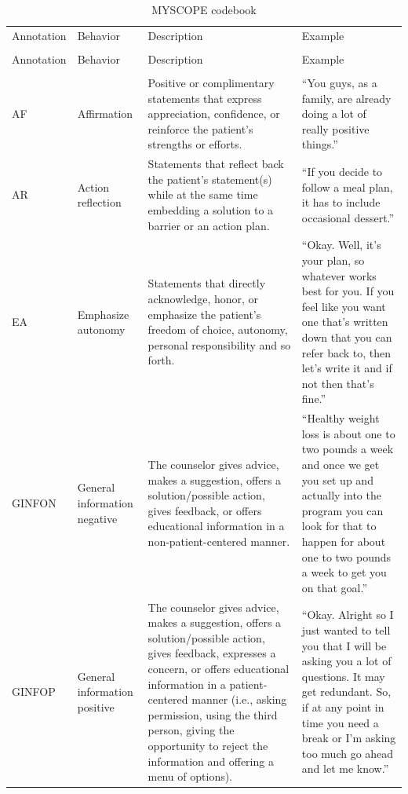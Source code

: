 \documentclass[smallextended]{svjour3}       %
\begin{document}
\begin{small}
\begin{longtable}{p{1.3cm}p{2cm}p{5cm}p{4.8cm}}
\caption{MYSCOPE codebook} 
\label{tab:codebook} \\
\hline\noalign{\smallskip}
Annotation & Behavior & Description & Example \\ 
\noalign{\smallskip}\hline\noalign{\smallskip}
\endfirsthead
\multicolumn{4}{@{}l}{\textbf{Table\ref{tab:codebook}} (continued)} \\ 
\noalign{\smallskip}\hline\noalign{\smallskip}
Annotation & Behavior & Description & Example \\
\noalign{\smallskip}\hline\noalign{\smallskip}
\endhead

\rowcolor{lightgraycol}
\noalign{\smallskip}
\multicolumn{4}{l}{\textbf{Counselor}} \\
\noalign{\smallskip}
AF & Affirmation & Positive or complimentary statements that express appreciation, confidence, or reinforce the patient's strengths or efforts. & ``You guys, as a family, are already doing a lot of really positive things.'' \\
AR & Action reflection & Statements that reflect back the patient's statement(s) while at the same time embedding a solution to a barrier or an action plan. & ``If you decide to follow a meal plan, it has to include occasional dessert.'' \\
EA & Emphasize autonomy & Statements that directly acknowledge, honor, or emphasize the patient's freedom of choice, autonomy, personal responsibility and so forth. & ``Okay. Well, it's your plan, so whatever works best for you. If you feel like you want one that's written down that you can refer back to, then let's write it and if not then that's fine.''\\
GINFON & General information negative & The counselor gives advice, makes a suggestion, offers a solution/possible action, gives feedback, or offers educational information in a non-patient-centered manner. & ``Healthy weight loss is about one to two pounds a week and once we get you set up and actually into the program you can look for that to happen for about one to two pounds a week to get you on that goal.''\\
GINFOP & General information positive & The counselor gives advice, makes a suggestion, offers a solution/possible action, gives feedback, expresses a concern, or offers educational information in a patient-centered manner (i.e., asking permission, using the third person, giving the opportunity to reject the information and offering a menu of options). & ``Okay.  Alright so I just wanted to tell you that I will be asking you a lot of questions.  It may get redundant.  So, if at any point in time you need a break or I'm asking too much go ahead and let me know.''\\

\end{longtable}
\end{small}
\end{document}
